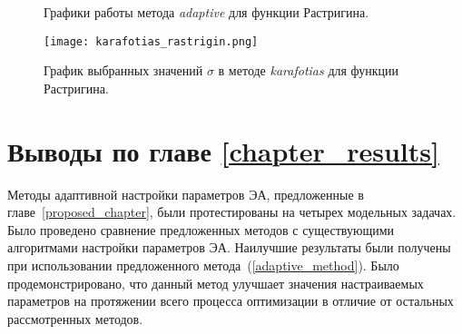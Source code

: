 \begin{figure}
  \centering
  \caption{ Графики работы метода \textit{adaptive} для функции Растригина.}
  \label{adaptive_rastrigin_plot}
\end{figure}

\begin{figure}
  \centering
  \texttt{[image: karafotias\_rastrigin.png]}
  \caption{График выбранных значений $\sigma$ в методе \textit{karafotias} для функции Растригина.}
  \label{karafotias_rastrigin}
\end{figure}

\section{Выводы по главе \protect\ref{chapter_results}}

Методы адаптивной настройки параметров ЭА, предложенные в главе~\ref{proposed_chapter}, были протестированы на четырех модельных задачах. Было проведено сравнение предложенных методов с существующими алгоритмами настройки параметров ЭА. Наилучшие результаты были получены при использовании предложенного метода~(\ref{adaptive_method}). Было продемонстрировано, что данный метод улучшает значения настраиваемых параметров на протяжении всего процесса оптимизации в отличие от остальных рассмотренных методов.
